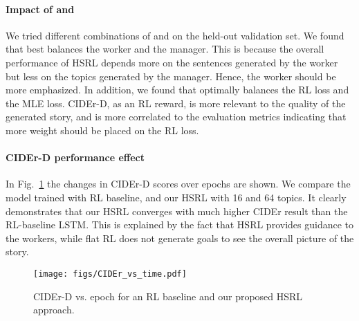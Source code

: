 \documentclass[letterpaper]{article} \usepackage{aaai19}  \usepackage{times}  \usepackage{helvet}  \usepackage{courier}  \usepackage{url}  \usepackage{graphicx}
\begin{document}
\clearpage
{}



\paragraph{Impact of  and } We tried different combinations of  and  on  the held-out validation set. We found that  best balances the worker and the manager. This is because the overall performance of HSRL depends more on the sentences generated by the worker but less on the topics generated by the manager. Hence, the worker should be more emphasized.  In addition, we found that  optimally balances the RL loss and the MLE loss. CIDEr-D, as an RL reward, is more relevant to the quality of the generated story, and is more correlated to the evaluation metrics indicating that more weight should be placed on the RL loss. 

\paragraph{CIDEr-D performance effect} 
In Fig.~\ref{fig:CIDEr} the changes in CIDEr-D scores over epochs are shown. We compare the model trained with RL baseline, and our HSRL with 16 and 64 topics. It clearly demonstrates that our HSRL converges with much higher CIDEr result than the RL-baseline LSTM. 
This is explained by the fact that HSRL provides guidance to the workers, while flat RL does not generate goals to see the overall picture of the story.

\begin{figure}[h]
	\centering
	\texttt{[image: figs/CIDEr\_vs\_time.pdf]}
	\caption{CIDEr-D vs. epoch for an RL baseline and our proposed HSRL approach. \small
	}
	\label{fig:CIDEr}
\end{figure}
\end{document}

